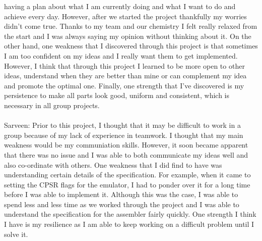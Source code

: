 \documentclass[a4paper]{article}
\begin{document}
having a plan about what I am currently doing and what I want to do and achieve every day. However, after we started the 
project thankfully my worries didn't come true. Thanks to my team and our chemistry I felt really relaxed
from the start and I was always saying my opinion without thinking about it. On the other hand, one weakness
that I discovered through this project is that sometimes I am too confident on my ideas and I really want them to get implemented. 
However, I think that through this project I learned to be more open to other ideas, understand when they are better than mine or
can complement my idea and promote the optimal one. Finally, one strength that I've discovered is my persistence to make all parts
look good, uniform and consistent, which is necessary in all group projects.
\\ \\
Sarveen: Prior to this project, I thought that it may be difficult to work in a group because of my lack of experience in teamwork.
I thought that my main weakness would be my communiation skills. However, it soon became apparent that there was no issue and I was able
to both communicate my ideas well and also co-ordinate with others. One weakness that I did find to have was understanding certain
details of the specification. For example, when it came to setting the CPSR flags for the emulator, I had to ponder over it for a long
time before I was able to implement it. Although this was the case, I was able to spend less and less time as we worked through the 
project and I was able to understand the specification for the assembler fairly quickly. One strength I think I have is my resilience as 
I am able to keep working on a difficult problem until I solve it. 
\end{document}

